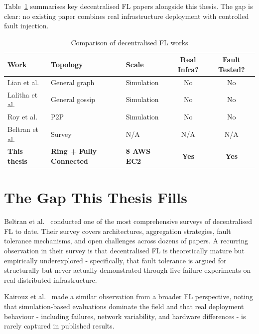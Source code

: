 \documentclass[12pt]{report}
\begin{document}
Table~\ref{tab:lit-comparison} summarises key decentralised FL papers
alongside this thesis. The gap is clear: no existing paper combines
real infrastructure deployment with controlled fault injection.
 
\begin{table}[H]
\centering
\small
\begin{tabular}{p{3.2cm}p{2.8cm}p{2.2cm}cc}
\toprule
\textbf{Work} & \textbf{Topology} & \textbf{Scale} &
\textbf{Real Infra?} & \textbf{Fault Tested?} \\
\midrule
Lian et al.~\cite{lian2017}             & General graph  & Simulation & No  & No \\
Lalitha et al.~\cite{lalitha2019}       & General gossip & Simulation & No  & No \\
Roy et al.~\cite{roy2019}               & P2P            & Simulation & No  & No \\
Beltran et al.~\cite{beltransurvey2023} & Survey         & N/A        & N/A & N/A \\
\textbf{This thesis} & \textbf{Ring + Fully Connected} & \textbf{8 AWS EC2} & \textbf{Yes} & \textbf{Yes} \\
\bottomrule
\end{tabular}
\vspace{0.5cm}
\caption{Comparison of decentralised FL works}
\label{tab:lit-comparison}
\end{table}

\section{The Gap This Thesis Fills}

Beltran et al.~\cite{beltransurvey2023} conducted one of the most comprehensive
surveys of decentralised FL to date. Their survey covers architectures, aggregation
strategies, fault tolerance mechanisms, and open challenges across dozens of papers.
A recurring observation in their survey is that decentralised FL is theoretically
mature but empirically underexplored - specifically, that fault tolerance is
argued for structurally but never actually demonstrated through live failure
experiments on real distributed infrastructure.

Kairouz et al.~\cite{kairouz2021} made a similar observation from a broader FL
perspective, noting that simulation-based evaluations dominate the field and that
real deployment behaviour - including failures, network variability, and hardware
differences - is rarely captured in published results.
\end{document}

